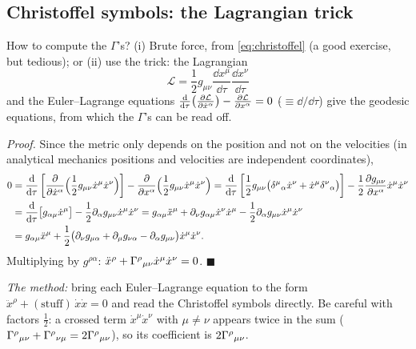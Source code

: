 \subsection{Christoffel symbols: the Lagrangian trick}
How to compute the $\Gamma$'s? (i) Brute force, from \eqref{eq:christoffel} (a good exercise, but tedious); or (ii) use the trick: the Lagrangian
\[
  \mathcal L=\frac12g_{\mu\nu}\frac{\dd x^\mu}{\dd\tau}\frac{\dd x^\nu}{\dd\tau}
\]
and the Euler--Lagrange equations $\frac{\mathrm{d}}{\mathrm{d}\tau}\big(\frac{\partial\mathcal L}{\partial\dot x^\alpha}\big)-\frac{\partial\mathcal L}{\partial x^\alpha}=0$ ($\dot{}\equiv\dd/\dd\tau$) give the geodesic equations, from which the $\Gamma$'s can be read off.

\textit{Proof.} Since the metric only depends on the position and not on the velocities (in analytical mechanics positions and velocities are independent coordinates),
\begin{align*}
  0&=\frac{\mathrm{d}}{\mathrm{d}\tau}\left[\frac{\partial}{\partial\dot x^\alpha}\Big(\frac12g_{\mu\nu}\dot x^\mu\dot x^\nu\Big)\right]-\frac{\partial}{\partial x^\alpha}\Big(\frac12g_{\mu\nu}\dot x^\mu\dot x^\nu\Big)
   =\frac{\mathrm{d}}{\mathrm{d}\tau}\left[\frac12g_{\mu\nu}\big(\delta^\mu{}_\alpha\dot x^\nu+\dot x^\mu\delta^\nu{}_\alpha\big)\right]-\frac12\frac{\partial g_{\mu\nu}}{\partial x^\alpha}\dot x^\mu\dot x^\nu\\
  &=\frac{\mathrm{d}}{\mathrm{d}\tau}\big[g_{\alpha\mu}\dot x^\mu\big]-\frac12\partial_\alpha g_{\mu\nu}\dot x^\mu\dot x^\nu
   =g_{\alpha\mu}\ddot x^\mu+\partial_\nu g_{\alpha\mu}\dot x^\nu\dot x^\mu-\frac12\partial_\alpha g_{\mu\nu}\dot x^\mu\dot x^\nu\\
  &=g_{\alpha\mu}\ddot x^\mu+\frac12\big(\partial_\nu g_{\mu\alpha}+\partial_\mu g_{\nu\alpha}-\partial_\alpha g_{\mu\nu}\big)\dot x^\mu\dot x^\nu .
\end{align*}
Multiplying by $g^{\rho\alpha}$: $\ddot x^\rho+\Gamma^{\rho}{}_{\mu\nu}\dot x^\mu\dot x^\nu=0$. $\blacksquare$

\emph{The method:} bring each Euler--Lagrange equation to the form $\ddot x^\rho+(\text{stuff})\,\dot x\dot x=0$ and read the Christoffel symbols directly. Be careful with factors $\frac12$: a crossed term $\dot x^\mu\dot x^\nu$ with $\mu\neq\nu$ appears twice in the sum ($\Gamma^{\rho}{}_{\mu\nu}+\Gamma^{\rho}{}_{\nu\mu}=2\Gamma^{\rho}{}_{\mu\nu}$), so its coefficient is $2\Gamma^{\rho}{}_{\mu\nu}$.

